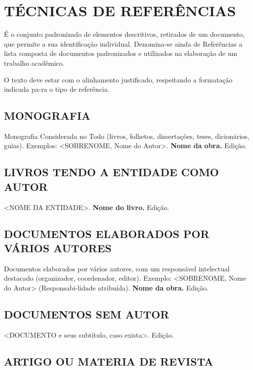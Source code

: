 %
%

\chapter{TÉCNICAS DE REFERÊNCIAS}

É o conjunto padronizado de elementos descritivos, retirados de um documento, que permite a sua identificação individual. Denomina-se ainda de Referências a lista composta de documentos padronizados e utilizados na elaboração de um trabalho acadêmico.

O texto deve estar com o alinhamento justificado, respeitando a formatação indicada pa-ra o tipo de referência. 

\section{MONOGRAFIA}

Monografia Considerada no Todo (livros, folhetos, dissertações,
teses, dicionários, guias). Exemplos: <SOBRENOME, Nome do Autor>. \textbf{Nome
da obra.} Edição.

\section{LIVROS TENDO A ENTIDADE COMO AUTOR}

<NOME DA ENTIDADE>. \textbf{Nome do livro.} Edição.

\section{DOCUMENTOS ELABORADOS POR VÁRIOS AUTORES}

Documentos elaborados por vários autores, com um responsável
intelectual destacado (organizador, coordenador, editor). Exemplo: <SOBRENOME,
Nome do Autor> (Responsabi-lidade atribuída). \textbf{Nome da obra.} Edição.

\section{DOCUMENTOS SEM AUTOR}

<DOCUMENTO e seus subtítulo, caso exista>. Edição. 

\section{ARTIGO OU MATERIA DE REVISTA}

